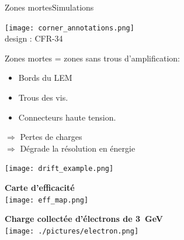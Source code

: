     \begin{frame}{Zones mortes}{Simulations}
       	\begin{scriptsize}
       		\begin{minipage}{0.38\textwidth}
       			\begin{center}
       				\texttt{[image: corner\_annotations.png]}\\
       				design : CFR-34\\
       			\end{center} 
       			Zones mortes = zones sans trous d'amplification:
       			\begin{itemize}
       				\item Bords du LEM
       				\item Trous des vis.
       				\item Connecteurs haute tension.
       			\end{itemize}
       			$\Rightarrow$ Pertes de charges\\
       			$\Rightarrow$ Dégrade la résolution en énergie\\
       		\end{minipage}
       		\begin{minipage}{0.58\textwidth}
       			\centering
       			\texttt{[image: drift\_example.png]}\\
       			\vspace{0.5cm} \hspace{0.1cm}
       			\begin{minipage}{0.48\textwidth}
       				\centering
       				\textbf{Carte d'efficacité}\\
       				\texttt{[image: eff\_map.png]}
       			\end{minipage}\hfill
       			\begin{minipage}{0.48\textwidth}
       				\centering
       				\textbf{Charge collectée d'électrons de \SI{3}{\giga\eV}}\\
       				\texttt{[image: ./pictures/electron.png]}
       			\end{minipage}
       		\end{minipage}
       	\end{scriptsize} 
    \end{frame}

